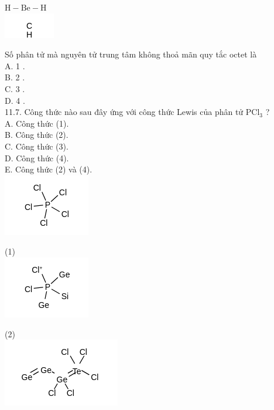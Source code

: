 \documentclass[10pt]{article}
\begin{document}
$\mathrm{H}-\mathrm{Be}-\mathrm{H}$\\
\includegraphics{smile-30674b879568ebbd9c22a96bf4ccff86b12d0434}

Số phân tử mà nguyên tử trung tâm không thoả mãn quy tắc octet là\\
A. 1 .\\
B. 2 .\\
C. 3 .\\
D. 4 .\\
11.7. Công thức nào sau đây ứng với công thức Lewis của phân tử $\mathrm{PCl}_{3}$ ?\\
A. Công thức (1).\\
B. Công thức (2).\\
C. Công thức (3).\\
D. Công thức (4).\\
E. Công thức (2) và (4).\\
\includegraphics{smile-9415d39ed58d7d536ffe4133bc88dca68e5e4c56}

(1)\\
\includegraphics{smile-99b0fb6d6b6e03c90477015cbfd9ffd12b1d4fbc}

(2)\\
\includegraphics{smile-1aa8e2883a8d266f7ab6ad03cb0f3e1d37b64563}
\end{document}
